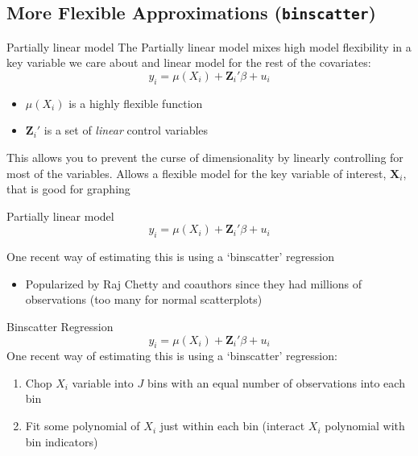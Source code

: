\documentclass[aspectratio=169,t,11pt,table]{beamer}
\begin{document}
\subsection{More Flexible Approximations (\texttt{binscatter})}

\begin{frame}{Partially linear model}
  The \alert{Partially linear model} mixes high model flexibility in a key variable we care about and linear model for the rest of the covariates:
  $$
    y_i = \mu(X_i) + \bm{Z}_i' \beta + u_i
  $$
  \begin{itemize}
    \item $\mu(X_i)$ is a highly flexible function

    \item $\bm{Z}_i'$ is a set of \emph{linear} control variables
  \end{itemize}

  \bigskip
  This allows you to prevent the curse of dimensionality by linearly controlling for most of the variables. 
  Allows a flexible model for the key variable of interest, $\bm{X}_i$, that is good for graphing
\end{frame}

\begin{frame}{Partially linear model}
  $$
    y_i = \mu(X_i) + \bm{Z}_i' \beta + u_i
  $$
  
  \bigskip
  One recent way of estimating this is using a `binscatter' regression 
  \begin{itemize}
    \item Popularized by Raj Chetty and coauthors since they had millions of observations (too many for normal scatterplots)
  \end{itemize}
\end{frame}

\begin{frame}{Binscatter Regression}
  $$
    y_i = \mu(X_i) + \bm{Z}_i' \beta + u_i
  $$
  One recent way of estimating this is using a `binscatter' regression:
  \begin{enumerate}
    \item Chop $X_i$ variable into $J$ bins with an equal number of observations into each bin
    
    \item Fit some polynomial of $X_i$ just within each bin (interact $X_i$ polynomial with bin indicators)
  \end{enumerate}
\end{frame}
\end{document}
